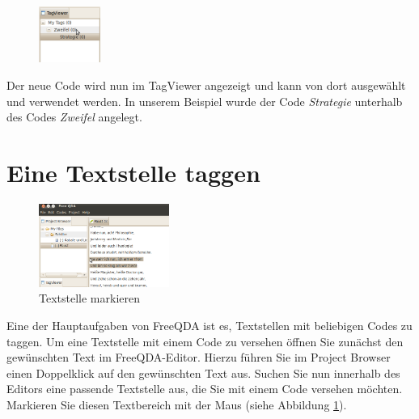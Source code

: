 \begin{figure}
 \vspace{-28pt}
 \begin{center}
    \includegraphics[width=0.18\textwidth]{img/tagviewer}
  \end{center}
  \vspace{12pt}
\end{figure}

Der neue Code wird nun im TagViewer angezeigt und kann von dort ausgewählt und verwendet werden. In unserem Beispiel wurde der %
Code \textit{Strategie} unterhalb des Codes \textit{Zweifel} angelegt.\\[16mm]
\vfill
\section{Eine Textstelle taggen}
\begin{figure}
 \vspace{-28pt}
 \begin{center}
    \includegraphics[width=0.38\textwidth]{img/tagtext1}
	\caption{Textstelle markieren}
	\label{fig:texttag1}
  \end{center}
  \vspace{12pt}
\end{figure}

Eine der Hauptaufgaben von FreeQDA ist es, Textstellen mit beliebigen Codes zu taggen. Um eine Textstelle mit einem Code zu versehen öffnen %
Sie zunächst den gewünschten Text im FreeQDA-Editor. Hierzu führen Sie im Project Browser einen Doppelklick auf den gewünschten Text aus. %
Suchen Sie nun innerhalb des Editors eine passende Textstelle aus, die Sie mit einem Code versehen möchten. Markieren Sie diesen %
Textbereich mit der Maus (siehe Abbildung \ref{fig:texttag1}).

\newpage

